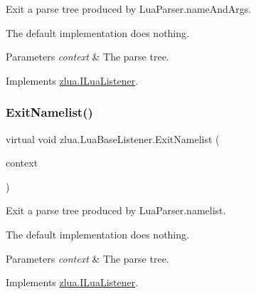 Exit a parse tree produced by Lua\+Parser.\+name\+And\+Args. 

The default implementation does nothing.


\begin{DoxyParams}{Parameters}
{\em context} & The parse tree.\\
\hline
\end{DoxyParams}


Implements \mbox{\hyperlink{interfacezlua_1_1_i_lua_listener_a1f6a7b27829eca2db7ed31a06cc3ae38}{zlua.\+I\+Lua\+Listener}}.

\mbox{\label{classzlua_1_1_lua_base_listener_aa501c2703fd2c5279c7cd6748aebd84b}} 
\subsubsection{\texorpdfstring{Exit\+Namelist()}{ExitNamelist()}}
{\footnotesize\ttfamily virtual void zlua.\+Lua\+Base\+Listener.\+Exit\+Namelist (\begin{DoxyParamCaption}\item[{\mbox{[}\+Not\+Null\mbox{]} \mbox{\hyperlink{classzlua_1_1_lua_parser_1_1_namelist_context}{Lua\+Parser.\+Namelist\+Context}}}]{context }\end{DoxyParamCaption})\hspace{0.3cm}{\ttfamily [virtual]}}



Exit a parse tree produced by Lua\+Parser.\+namelist. 

The default implementation does nothing.


\begin{DoxyParams}{Parameters}
{\em context} & The parse tree.\\
\hline
\end{DoxyParams}


Implements \mbox{\hyperlink{interfacezlua_1_1_i_lua_listener_acd614a0aa9df1e1ead1690e7598414df}{zlua.\+I\+Lua\+Listener}}.

\mbox{\label{classzlua_1_1_lua_base_listener_a997d90f5a6a982d2bf09d4d2f249908f}} 
